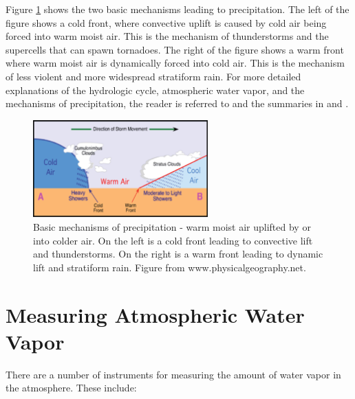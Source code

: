 \documentclass[proposal]{umassthesis}
\begin{document}
Figure \ref{fig:cold_warm_fronts} shows the two basic mechanisms leading to precipitation. The left of the figure shows a cold front, where convective uplift is caused by cold air being forced into warm moist air. This is the mechanism of thunderstorms and the supercells that can spawn tornadoes. The right of the figure shows a warm front where warm moist air is dynamically forced into cold air. This is the mechanism of less violent and more widespread stratiform rain. For more detailed explanations of the hydrologic cycle, atmospheric water vapor, and the mechanisms of precipitation, the reader is referred to \cite{barry2009atmosphere} and the summaries in \cite{ming2014} and \cite{doviak1993doppler}. 
\begin{figure}[!h]
\begin{center}
\includegraphics[width = 0.6\textwidth]{cold_warm_fronts.eps}
\caption{Basic mechanisms of precipitation - warm moist air uplifted by or into colder air. On the left is a cold front leading to convective lift and thunderstorms. On the right is a warm front leading to dynamic lift and stratiform rain. Figure from www.physicalgeography.net.}
\label{fig:cold_warm_fronts}
\end{center}
\end{figure}

\section{Measuring Atmospheric Water Vapor}

There are a number of instruments for measuring the amount of water vapor in the atmosphere. These include:
\end{document}
